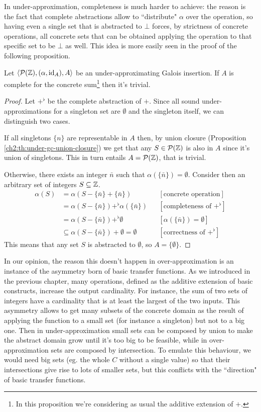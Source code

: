 In under-approximation, completeness is much harder to achieve: the reason is the fact that complete abstractions allow to ``distribute" $\alpha$ over the operation, so having even a single set that is abstracted to $\bot$ forces, by strictness of concrete operations, all concrete sets that can be obtained applying the operation to that specific set to be $\bot$ as well. This idea is more easily seen in the proof of the following proposition.
\begin{prop}\label{ch3:th:sum-complete-trivial}
	Let $\langle \mathcal{P}(\mathbb{Z}), (\alpha, \text{id}_{A}), A \rangle$ be an under-approximating Galois insertion. If $A$ is complete for the concrete sum\footnote{In this proposition we're considering as usual the additive extension of $+$.} then it's trivial.
\end{prop}
\begin{proof}
	Let $+^{\flat}$ be the complete abstraction of $+$.
	Since all sound under-approximations for a singleton set are $\emptyset$ and the singleton itself, we can distinguish two cases.

	If all singletons $\{ n \}$ are representable in $A$ then, by union closure (Proposition \ref{ch2:th:under-gc-union-closure}) we get that any $S \in \mathcal{P}(\mathbb{Z})$ is also in $A$ since it's union of singletons. This in turn entails $A = \mathcal{P}(\mathbb{Z})$, that is trivial.

	Otherwise, there exists an integer $\bar{n}$ such that $\alpha(\{ \bar{n} \}) = \emptyset$. Consider then an arbitrary set of integers $S \subseteq \mathbb{Z}$.
	\begin{align*}
		\alpha(S) &= \alpha(S - \{ \bar{n} \} + \{ \bar{n} \} )      &&[\text{concrete operation}] \\
		&= \alpha(S - \{ \bar{n} \}) +^{\flat} \alpha(\{ \bar{n} \}) &&[\text{completeness of }+^{\flat}] \\
		&= \alpha(S - \{ \bar{n} \}) +^{\flat} \emptyset             &&[\alpha(\{ \bar{n} \}) = \emptyset] \\
		&\subseteq \alpha(S - \{ \bar{n} \}) + \emptyset = \emptyset &&[\text{correctness of }+^{\flat}]
	\end{align*}
	This means that any set $S$ is abstracted to $\emptyset$, so $A = \{ \emptyset \}$.
\end{proof}

In our opinion, the reason this doesn't happen in over-approximation is an instance of the asymmetry born of basic transfer functions. As we introduced in the previous chapter, many operations, defined as the additive extension of basic constructs, increase the output cardinality. For instance, the sum of two sets of integers have a cardinality that is at least the largest of the two inputs. This asymmetry allows to get many subsets of the concrete domain as the result of applying the function to a small set (for instance a singleton) but not to a big one.
Then in under-approximation small sets can be composed by union to make the abstract domain grow until it's too big to be feasible, while in over-approximation sets are composed by intersection. To emulate this behaviour, we would need big sets (eg. the whole $C$ without a single value) so that their intersections give rise to lots of smaller sets, but this conflicts with the ``direction" of basic transfer functions.

